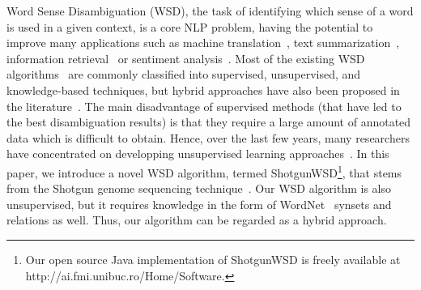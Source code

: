 \documentclass[11pt]{article}
\begin{document}
Word Sense Disambiguation (WSD), the task of identifying which sense of a word is used in a given context, is a core NLP problem, having the potential to improve many applications such as machine translation~\cite{Carpuat-EMNLP-2007}, text summarization~\cite{Plaza-WSD-2011}, information retrieval~\cite{adi-radu-WSD-2012,Chifu-IPM-2014} or sentiment analysis~\cite{Sumanth-WASSA-2015}. Most of the existing WSD algorithms~\cite{agirre-2006,Navigli-WSD-2009} are commonly classified into supervised, unsupervised, and knowledge-based techniques, but hybrid approaches have also been proposed in the literature~\cite{Hristea-2008}. The main disadvantage of supervised methods (that have led to the best disambiguation results) is that they require a large amount of annotated data which is difficult to obtain. Hence, over the last few years, many researchers have concentrated on developping unsupervised learning approaches~\cite{Schwab-COLING-2012,Schwab-WET-2013,GETALP-2013,Chen-EMNLP-2014,Bhingardive-NAACL-2015}. In this paper, we introduce a novel WSD algorithm, termed ShotgunWSD\footnote{Our open source Java implementation of ShotgunWSD is freely available at http://ai.fmi.unibuc.ro/Home/Software.}, that stems from the Shotgun genome sequencing technique~\cite{Shotgun-1981,Istrail-2004}. Our WSD algorithm is also unsupervised, but it requires knowledge in the form of WordNet~\cite{Miller-WN-1995,Fellbaum-WN-1998} synsets and relations as well. Thus, our algorithm can be regarded as a hybrid approach. 
\end{document}

